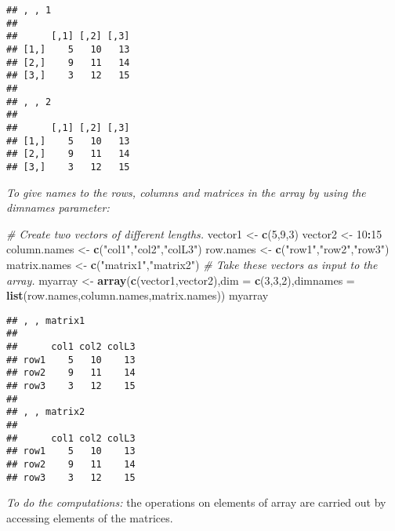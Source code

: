 \documentclass[]{book}
\newenvironment{Shaded}{\begin{snugshade}}{\end{snugshade}}
\newcommand{\KeywordTok}[1]{\textcolor[rgb]{0.13,0.29,0.53}{\textbf{#1}}}
\newcommand{\DataTypeTok}[1]{\textcolor[rgb]{0.13,0.29,0.53}{#1}}
\newcommand{\DecValTok}[1]{\textcolor[rgb]{0.00,0.00,0.81}{#1}}
\newcommand{\StringTok}[1]{\textcolor[rgb]{0.31,0.60,0.02}{#1}}
\newcommand{\CommentTok}[1]{\textcolor[rgb]{0.56,0.35,0.01}{\textit{#1}}}
\newcommand{\OperatorTok}[1]{\textcolor[rgb]{0.81,0.36,0.00}{\textbf{#1}}}
\newcommand{\NormalTok}[1]{#1}
\theoremstyle{definition}
\theoremstyle{definition}
\theoremstyle{definition}
\theoremstyle{remark}
\begin{document}
\begin{verbatim}
## , , 1
## 
##      [,1] [,2] [,3]
## [1,]    5   10   13
## [2,]    9   11   14
## [3,]    3   12   15
## 
## , , 2
## 
##      [,1] [,2] [,3]
## [1,]    5   10   13
## [2,]    9   11   14
## [3,]    3   12   15
\end{verbatim}

\emph{To give names to the rows, columns and matrices in the array by
using the dimnames parameter:}

\begin{Shaded}
\begin{Highlighting}[]
\CommentTok{# Create two vectors of different lengths.}
\NormalTok{vector1 <-}\StringTok{ }\KeywordTok{c}\NormalTok{(}\DecValTok{5}\NormalTok{,}\DecValTok{9}\NormalTok{,}\DecValTok{3}\NormalTok{)}
\NormalTok{vector2 <-}\StringTok{ }\DecValTok{10}\OperatorTok{:}\DecValTok{15}
\NormalTok{column.names <-}\StringTok{ }\KeywordTok{c}\NormalTok{(}\StringTok{"col1"}\NormalTok{,}\StringTok{"col2"}\NormalTok{,}\StringTok{"colL3"}\NormalTok{)}
\NormalTok{row.names <-}\StringTok{ }\KeywordTok{c}\NormalTok{(}\StringTok{"row1"}\NormalTok{,}\StringTok{"row2"}\NormalTok{,}\StringTok{"row3"}\NormalTok{)}
\NormalTok{matrix.names <-}\StringTok{ }\KeywordTok{c}\NormalTok{(}\StringTok{"matrix1"}\NormalTok{,}\StringTok{"matrix2"}\NormalTok{)}
\CommentTok{# Take these vectors as input to the array.}
\NormalTok{myarray <-}\StringTok{ }\KeywordTok{array}\NormalTok{(}\KeywordTok{c}\NormalTok{(vector1,vector2),}\DataTypeTok{dim =} \KeywordTok{c}\NormalTok{(}\DecValTok{3}\NormalTok{,}\DecValTok{3}\NormalTok{,}\DecValTok{2}\NormalTok{),}\DataTypeTok{dimnames =} \KeywordTok{list}\NormalTok{(row.names,column.names,matrix.names))}
\NormalTok{myarray}
\end{Highlighting}
\end{Shaded}

\begin{verbatim}
## , , matrix1
## 
##      col1 col2 colL3
## row1    5   10    13
## row2    9   11    14
## row3    3   12    15
## 
## , , matrix2
## 
##      col1 col2 colL3
## row1    5   10    13
## row2    9   11    14
## row3    3   12    15
\end{verbatim}

\emph{To do the computations:} the operations on elements of array are
carried out by accessing elements of the matrices.
\end{document}
